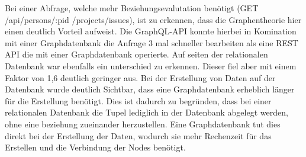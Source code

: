 \newline
\noindent
Bei einer Abfrage, welche mehr Beziehungsevalutation benötigt  (GET /api/persons/:pid /projects/issues), ist zu erkennen, dass die Graphentheorie hier einen deutlich Vorteil aufweist. Die GraphQL-API konnte hierbei in Komination mit einer Graphdatenbank die Anfrage 3 mal schneller bearbeiten als eine REST API die mit einer Graphdatenbank operierte. Auf seiten der relationalen Datenbank war ebenfalls ein unterschied zu erkennen. Dieser fiel aber mit einem Faktor von 1,6 deutlich geringer aus.
\newline
\noindent
Bei der Erstellung von Daten auf der Datenbank wurde deutlich Sichtbar, dass eine Graphdatenbank erheblich länger für die Erstellung benötigt. Dies ist dadurch zu begründen, dass bei einer relationalen Datenbank die Tupel lediglich in der Datenbank abgelegt werden, ohne eine beziehung zueinander herzustellen. Eine Graphdatenbank tut dies direkt bei der Erstellung der Daten, wodurch sie mehr Rechenzeit für das Erstellen und die Verbindung der Nodes benötigt. \citep{constantinov2015running}

